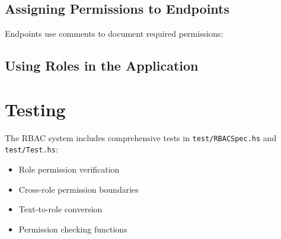 \subsection{Assigning Permissions to
Endpoints}\label{assigning-permissions-to-endpoints}

Endpoints use comments to document required permissions:

\begin{Shaded}
\begin{Highlighting}[]
  
\OtherTok{=}  \OperatorTok{$} \NormalTok{ [}\NormalTok{] }
\end{Highlighting}
\end{Shaded}

\subsection{Using Roles in the
Application}\label{using-roles-in-the-application}

\begin{Shaded}
\begin{Highlighting}[]
\OtherTok{=}
   
   
\end{Highlighting}
\end{Shaded}

\section{Testing}\label{testing}

The RBAC system includes comprehensive tests in
\texttt{test/RBACSpec.hs} and \texttt{test/Test.hs}:

\begin{itemize}
\tightlist
\item
  Role permission verification
\item
  Cross-role permission boundaries
\item
  Text-to-role conversion
\item
  Permission checking functions
\end{itemize}

